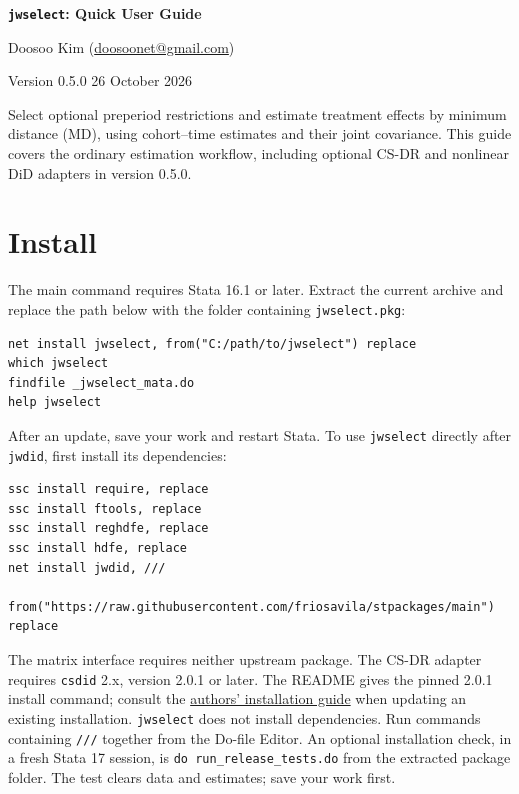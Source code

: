 \documentclass[11pt]{article}
\newcommand{\cmd}[1]{\texttt{#1}}
\begin{document}
\thispagestyle{empty}
{\LARGE\bfseries\color{navy}\texttt{jwselect}: Quick User Guide}\par
{\normalsize Doosoo Kim (\href{mailto:doosoonet@gmail.com}{doosoonet@gmail.com})}\par
{\small Version 0.5.0 \hfill 26 October 2026}\par
\vspace{3pt}
Select optional preperiod restrictions and estimate treatment effects by
minimum distance (MD), using cohort--time estimates and their joint covariance.
This guide covers the ordinary estimation workflow, including optional CS-DR
and nonlinear DiD adapters in version 0.5.0.

\section{Install}
The main command requires Stata 16.1 or later. Extract the current archive and
replace the path below with the folder containing \cmd{jwselect.pkg}:
\begin{lstlisting}
net install jwselect, from("C:/path/to/jwselect") replace
which jwselect
findfile _jwselect_mata.do
help jwselect
\end{lstlisting}
After an update, save your work and restart Stata. To use \cmd{jwselect}
directly after \cmd{jwdid}, first install its dependencies:
\begin{lstlisting}
ssc install require, replace
ssc install ftools, replace
ssc install reghdfe, replace
ssc install hdfe, replace
net install jwdid, ///
    from("https://raw.githubusercontent.com/friosavila/stpackages/main") replace
\end{lstlisting}
The matrix interface requires neither upstream package. The CS-DR adapter
requires \cmd{csdid} 2.x, version 2.0.1 or later. The README gives the pinned
2.0.1 install command; consult the
\href{https://psantanna.com/csdid/}{authors' installation guide} when updating
an existing installation. \cmd{jwselect} does not install dependencies.
Run commands containing \cmd{///} together from the Do-file Editor.
An optional installation check, in a fresh Stata 17 session, is
\cmd{do run\_release\_tests.do} from the extracted package folder.
The test clears data and estimates; save your work first.
\end{document}
